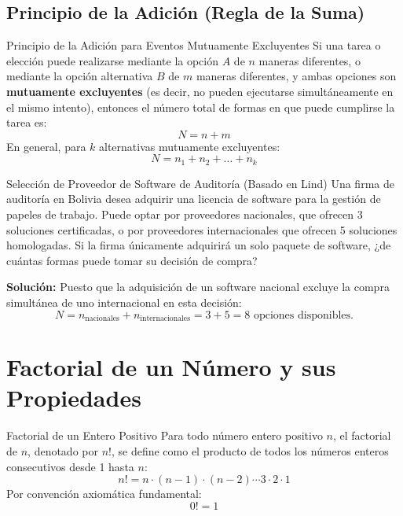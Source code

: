 \subsection{Principio de la Adición (Regla de la Suma)}
\begin{definicion}{Principio de la Adición para Eventos Mutuamente Excluyentes}
Si una tarea o elección puede realizarse mediante la opción $A$ de $n$ maneras diferentes, o mediante la opción alternativa $B$ de $m$ maneras diferentes, y ambas opciones son \textbf{mutuamente excluyentes} (es decir, no pueden ejecutarse simultáneamente en el mismo intento), entonces el número total de formas en que puede cumplirse la tarea es:
\begin{equation}
    N = n + m
\end{equation}
En general, para $k$ alternativas mutuamente excluyentes:
\begin{equation}
    N = n_1 + n_2 + \dots + n_k
\end{equation}
\end{definicion}

\begin{ejemplo}{Selección de Proveedor de Software de Auditoría (Basado en Lind)}
Una firma de auditoría en Bolivia desea adquirir una licencia de software para la gestión de papeles de trabajo. Puede optar por proveedores nacionales, que ofrecen 3 soluciones certificadas, o por proveedores internacionales que ofrecen 5 soluciones homologadas. Si la firma únicamente adquirirá un solo paquete de software, ¿de cuántas formas puede tomar su decisión de compra?

\tcbline
\textbf{Solución:}
Puesto que la adquisición de un software nacional excluye la compra simultánea de uno internacional en esta decisión:
\[
N = n_{\text{nacionales}} + n_{\text{internacionales}} = 3 + 5 = 8 \text{ opciones disponibles.}
\]
\end{ejemplo}

\section{Factorial de un Número y sus Propiedades}
\begin{definicion}{Factorial de un Entero Positivo}
Para todo número entero positivo $n$, el factorial de $n$, denotado por $n!$, se define como el producto de todos los números enteros consecutivos desde 1 hasta $n$:
\begin{equation}
    n! = n \cdot (n-1) \cdot (n-2) \dotsm 3 \cdot 2 \cdot 1
\end{equation}
Por convención axiomática fundamental:
\begin{equation}
    0! = 1
\end{equation}
\end{definicion}

